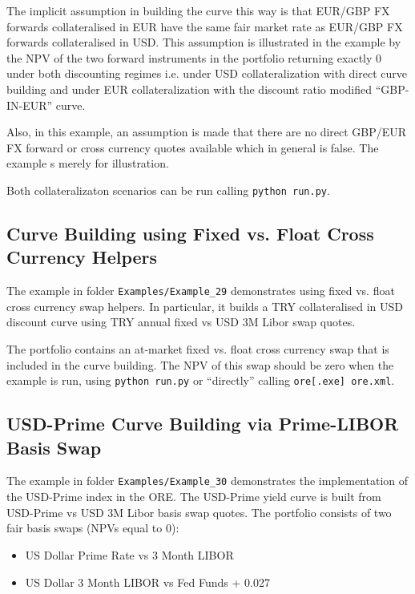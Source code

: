 The implicit assumption in building the curve this way is that EUR/GBP FX
forwards collateralised in EUR have the same fair market rate as EUR/GBP
FX forwards collateralised in USD. This assumption is illustrated in the
example by the NPV of the two forward instruments in the portfolio returning
exactly 0 under both discounting regimes i.e. under USD collateralization with
direct curve building and under EUR collateralization with the discount ratio
modified ``GBP-IN-EUR'' curve.

Also, in this example, an assumption is made that there are no direct GBP/EUR FX
forward or cross currency quotes available which in general is false. The example
s merely for illustration.

Both collateralizaton scenarios can be run calling {\tt python run.py}.

\subsection{Curve Building using Fixed vs. Float Cross Currency Helpers}%
\label{example:29}

The example in folder {\tt Examples/Example\_29} demonstrates using fixed vs. float
cross currency swap helpers. In particular, it builds a TRY collateralised in USD
discount curve using TRY annual fixed vs USD 3M Libor swap quotes.

The portfolio contains an at-market fixed vs. float cross currency swap that is
included in the curve building. The NPV of this swap should be zero when the example is run,
using {\tt python run.py} or ``directly'' calling {\tt ore[.exe] ore.xml}.

\subsection{USD-Prime Curve Building via Prime-LIBOR Basis Swap}%
\label{example:30}

The example in folder {\tt Examples/Example\_30} demonstrates the implementation of the USD-Prime index in the ORE.
The USD-Prime yield curve is built from USD-Prime vs USD 3M Libor basis swap quotes.
The portfolio consists of two fair basis swaps (NPVs equal to 0):
\begin{itemize}
\item US Dollar Prime Rate vs 3 Month LIBOR
\item US Dollar 3 Month LIBOR vs Fed Funds + 0.027
\end{itemize}

